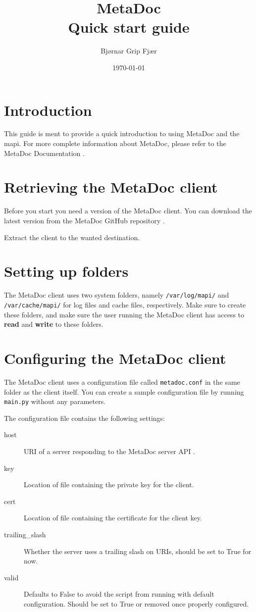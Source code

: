 \documentclass[titlepage, a4paper,10pt]{article}
\title{MetaDoc\\Quick start guide}
\author{Bjørnar Grip Fjær}
\date{\today}
\begin{document}
\maketitle

\section{Introduction}
This guide is ment to provide a quick introduction to using MetaDoc and the
\gls{mapi}. For more complete information about MetaDoc, please refer to the
MetaDoc Documentation \cite{mdoc}.

\section{Retrieving the MetaDoc client}
Before you start you need a version of the MetaDoc client. You can download the
latest version from the MetaDoc GitHub repository \cite{downloads}.

Extract the client to the wanted destination. 

\section{Setting up folders}
The MetaDoc client uses two system folders, namely \texttt{/var/log/mapi/} and
\texttt{/var/cache/mapi/} for log files and cache files, respectively. Make
sure to create these folders, and make sure the user running the MetaDoc client
has access to \textbf{read} and \textbf{write} to these folders. 

\section{Configuring the MetaDoc client}
The MetaDoc client uses a configuration file called \texttt{metadoc.conf} in
the same folder as the client itself. You can create a sample configuration
file by running \texttt{main.py} without any parameters. 

The configuration file contains the following settings:

\begin{description}
    \item[host] URI of a server responding to the MetaDoc server API
        \cite{mdoc}.
    \item[key]  Location of file containing the private key for the client.
    \item[cert] Location of file containing the certificate for the client key.
    \item[trailing\_slash]   Whether the server uses a trailing slash on URIs,
        should be set to True for now.
    \item[valid]    Defaults to False to avoid the script from running with
        default configuration. Should be set to True or removed once properly
        configured.
\end{description}
\end{document}
